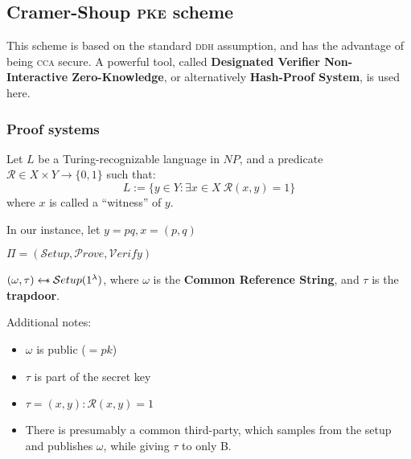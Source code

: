 \subsection{Cramer-Shoup \textsc{pke} scheme}

This scheme is based on the standard \textsc{ddh} assumption, and has the advantage of being \textsc{cca} secure. A powerful tool, called \textbf{Designated Verifier Non-Interactive Zero-Knowledge}, or alternatively \textbf{Hash-Proof System}, is used here.

\subsubsection{Proof systems}

Let $L$ be a Turing-recognizable language in $NP$, and a predicate $\mathcal{R} \in X \times Y \to \{0, 1\}$ such that:
\begin{equation*}
    L := \{y \in Y : \exists x \in X \: \mathcal{R}(x, y) = 1\}
\end{equation*}
where $x$ is called a ``witness'' of $y$.

In our instance, let $y = pq, x = (p,q)$

$\Pi = (\mathcal{S}etup, \mathcal{P}rove, \mathcal{V}erify)$

$(\omega, \tau) \pickUAR \mathcal{S}etup(1^\lambda)$, where $\omega$ is the \textbf{Common Reference String}, and $\tau$ is the \textbf{trapdoor}.

Additional notes:
\begin{itemize}
    \item $\omega$ is public ($ = pk$)
    \item $\tau$ is part of the secret key
    \item $\tau = (x, y) : \mathcal{R}(x, y) = 1$ %
    \item There is presumably a common third-party, which samples from the setup and publishes $\omega$, while giving $\tau$ to only B. %
\end{itemize}


